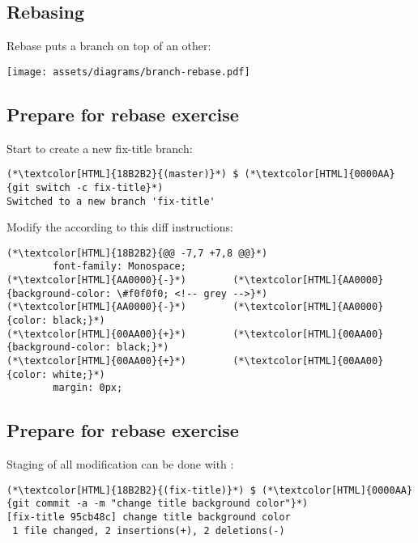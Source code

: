 \subsection{Rebasing}
\begin{frame}[fragile]
  \subslidetitle
  Rebase puts a branch on top of an other:
  \centerline{\texttt{[image: assets/diagrams/branch-rebase.pdf]}}
\end{frame}

\subsection{Prepare for rebase exercise}
\begin{frame}[fragile]
  \subslidetitle

  Start to create a new fix-title branch:
  \begin{lstlisting}
(*\textcolor[HTML]{18B2B2}{(master)}*) $ (*\textcolor[HTML]{0000AA}{git switch -c fix-title}*)
Switched to a new branch 'fix-title'
\end{lstlisting}

  Modify the  according to this diff instructions:
  \begin{lstlisting}
(*\textcolor[HTML]{18B2B2}{@@ -7,7 +7,8 @@}*)
        font-family: Monospace;
(*\textcolor[HTML]{AA0000}{-}*)        (*\textcolor[HTML]{AA0000}{background-color: \#f0f0f0; <!-- grey -->}*)
(*\textcolor[HTML]{AA0000}{-}*)        (*\textcolor[HTML]{AA0000}{color: black;}*)
(*\textcolor[HTML]{00AA00}{+}*)        (*\textcolor[HTML]{00AA00}{background-color: black;}*)
(*\textcolor[HTML]{00AA00}{+}*)        (*\textcolor[HTML]{00AA00}{color: white;}*)
        margin: 0px;
\end{lstlisting}
\end{frame}

\subsection{Prepare for rebase exercise}
\begin{frame}[fragile]
  \subslidetitle
  Staging of all modification can be done with :
  \begin{lstlisting}
(*\textcolor[HTML]{18B2B2}{(fix-title)}*) $ (*\textcolor[HTML]{0000AA}{git commit -a -m "change title background color"}*)
[fix-title 95cb48c] change title background color
 1 file changed, 2 insertions(+), 2 deletions(-)
\end{lstlisting}

\end{frame}

